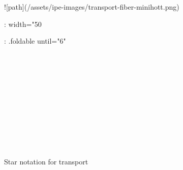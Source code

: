 ![path](/assets/ipe-images/transport-fiber-minihott.png){: width="50%

{: .foldable until="6" }
\begin{code}%
\>[0]\<%
\\
\>[0][@{}l@{\AgdaIndent{0}}]%
\>[2]\AgdaSymbol{:}\AgdaSpace{}%
\AgdaSpace{}%
\AgdaSymbol{\{}\AgdaSpace{}%
\AgdaSymbol{\}}\AgdaSpace{}%
\AgdaSymbol{\{}\AgdaSpace{}%
\AgdaSymbol{:}\AgdaSpace{}%
\AgdaSpace{}%
\AgdaSymbol{\}}\<%
\\
%
\>[2]\AgdaSpace{}%
\AgdaSymbol{(}\AgdaSpace{}%
\AgdaSymbol{:}\AgdaSpace{}%
\AgdaSpace{}%
\AgdaSpace{}%
\AgdaSpace{}%
\AgdaSymbol{)}\AgdaSpace{}%
\AgdaSymbol{\{}\AgdaSpace{}%
\AgdaSpace{}%
\AgdaSymbol{:}\AgdaSpace{}%
\AgdaSymbol{\}}\<%
\\
%
\>[2]\AgdaSpace{}%
\AgdaSymbol{(}\AgdaSpace{}%
\AgdaSymbol{:}\AgdaSpace{}%
\AgdaSpace{}%
\AgdaOperator{\AgdaDatatype{==}}\AgdaSpace{}%
\AgdaSymbol{)}\<%
\\
%
\>[2]\AgdaComment{-------------------------------}\<%
\\
%
\>[2]\AgdaSpace{}%
\AgdaSymbol{(}\AgdaSpace{}%
\AgdaSpace{}%
\AgdaSpace{}%
\AgdaSpace{}%
\AgdaSymbol{)}\<%
\\
%
\\[\AgdaEmptyExtraSkip]%
\>[0]\AgdaSpace{}%
\AgdaSpace{}%
\AgdaSpace{}%
\AgdaSymbol{=}\AgdaSpace{}%
\AgdaSpace{}%
\AgdaSpace{}%
\AgdaSpace{}%
\AgdaSymbol{)}\<%
\end{code}

\begin{code}%
\>[0]\<%
\\
\>[0]%
\>[7]\AgdaSymbol{=}\AgdaSpace{}%
\<%
\\
\>[0]\AgdaSpace{}%
\AgdaSymbol{=}\AgdaSpace{}%
\<%
\end{code}

Star notation for transport

}

